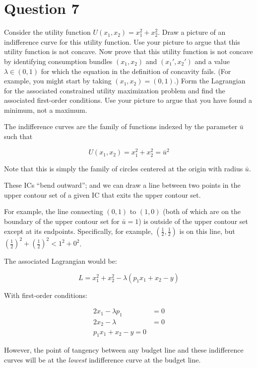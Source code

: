 \documentclass{article}
\newenvironment{solution}{\color{red}}{\color{black}}
\begin{document}
\section*{Question 7}
Consider the utility function $U(x_1,x_2)=x_1^2+x_2^2$.  Draw a picture of an indifference curve for this utility function.  Use your picture to argue that this utility function is not concave.  Now prove that this utility function is not concave by identifying consumption bundles $(x_1,x_2)$ and $(x_1',x_2')$ and a value $\lambda\in(0,1)$ for which the equation in the definition of concavity fails.  (For example, you might start by taking $(x_1,x_2)=(0,1)$.)  Form the Lagrangian for the associated constrained utility maximization problem and find the associated first-order conditions.  Use your picture to argue that you have found a minimum, not a maximum.

\begin{solution}
The indifference curves are the family of functions indexed by the parameter $\bar{u}$ such that

\[ U(x_1, x_2) = x_1^2 + x_2^2 = \bar{u}^2 \]

Note that this is simply the family of circles centered at the origin with radius $\bar{u}$.

These ICs ``bend outward''; and we can draw a line between two points in the upper contour set of a given IC that exits the upper contour set.

For example, the line connecting $(0,1)$ to $(1,0)$ (both of which are on the boundary of the upper contour set for $\bar{u} = 1$) is outside of the upper contour set except at its endpoints. Specifically, for example, $\left(\frac12, \frac12 \right)$ is on this line, but $\left(\frac12 \right)^2 + \left(\frac12 \right)^2 < 1^2 + 0^2$.

The associated Lagrangian would be:

\[ L = x_1^2 + x_2^2 - \lambda \left(p_1 x_1 + x_2 - y\right) \]

With first-order conditions:

\begin{align*}
2x_1 - \lambda p_1 &= 0 \\
2x_2 - \lambda &= 0 \\
p_1 x_1 + x_2 - y = 0
\end{align*}

However, the point of tangency between any budget line and these indifference curves will be at the \textit{lowest} indifference curve at the budget line.
\end{solution}
\end{document}
